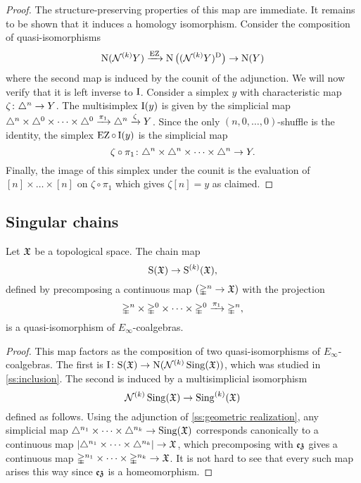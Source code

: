\begin{proof}
	The structure-preserving properties of this map are immediate.
	It remains to be shown that it induces a homology isomorphism.
	Consider the composition of quasi-isomorphisms
	\[
	\operatorname{N}(\mathcal{N}^{(k)} Y) \xrightarrow{\operatorname{EZ}}
	\operatorname{N}\big((\mathcal{N}^{(k)} Y)^{\mathrm{D}}\big) \to
	\operatorname{N}(Y)
	\]
	where the second map is induced by the counit of the adjunction.
	We will now verify that it is left inverse to $\operatorname{I}$.
	Consider a simplex $y$ with characteristic map $\zeta \colon \triangle^n \to Y$.
	The multisimplex $\operatorname{I}(y)$ is given by the simplicial map $\triangle^n \times \triangle^{0}\times\dots\times\triangle^{0} \xrightarrow{\pi_1} \triangle^n \xrightarrow{\zeta} Y$.
	Since the only $(n,0,\dots,0)$-shuffle is the identity, the simplex $\operatorname{EZ} \circ \operatorname{I} (y)$ is the simplicial map
	\[
	\zeta \circ \pi_1 \colon \triangle^n \times \triangle^{n}\times\dots\times\triangle^{n} \to Y.
	\]
	Finally, the image of this simplex under the counit is the evaluation of $[n] \times\dots\times [n]$ on $\zeta \circ \pi_1$ which gives $\zeta[n] = y$ as claimed.
\end{proof}

\subsection{Singular chains}\label{ss:singular}

\begin{theorem}
	Let $\mathfrak{X}$ be a topological space.
	The chain map
	\[
	\mathrm{S}(\mathfrak{X}) \to \mathrm{S}^{(k)}(\mathfrak{X}),
	\]
	defined by precomposing a continuous map $(\mathbb{\Delta}^n \to \mathfrak{X})$ with the projection
	\[
	\mathbb{\Delta}^n \times \mathbb{\Delta}^{0}\times\dots\times\mathbb{\Delta}^{0} \xrightarrow{\pi_1} \mathbb{\Delta}^n,
	\]
	is a quasi-isomorphism of $E_\infty$-coalgebras.
\end{theorem}

\begin{proof}
	This map factors as the composition of two quasi-isomorphisms of $E_\infty$-coalgebras.
	The first is $\operatorname{I} \colon \mathrm{S}(\mathfrak{X}) \to \operatorname{N}(\mathcal{N}^{(k)} \operatorname{Sing}(\mathfrak{X}))$, which was studied in \cref{ss:inclusion}.
	The second is induced by a multisimplicial isomorphism
	\[
	\mathcal{N}^{(k)} \operatorname{Sing}(\mathfrak{X}) \to \operatorname{Sing}^{(k)}(\mathfrak{X})
	\]
	defined as follows.
	Using the adjunction of \cref{ss:geometric realization}, any simplicial map $\triangle^{n_1}\times\dots\times\triangle^{n_k} \to \operatorname{Sing}(\mathfrak{X})$ corresponds canonically to a continuous map $\lvert\triangle^{n_1}\times\dots\times\triangle^{n_k}\rvert \to \mathfrak{X}$, which precomposing with $\operatorname{\mathfrak{ez}}$ gives a continuous map $\mathbb{\Delta}^{n_1}\times\dots\times\mathbb{\Delta}^{n_k} \to \mathfrak{X}$.
	It is not hard to see that every such map arises this way since $\operatorname{\mathfrak{ez}}$ is a homeomorphism.
\end{proof}